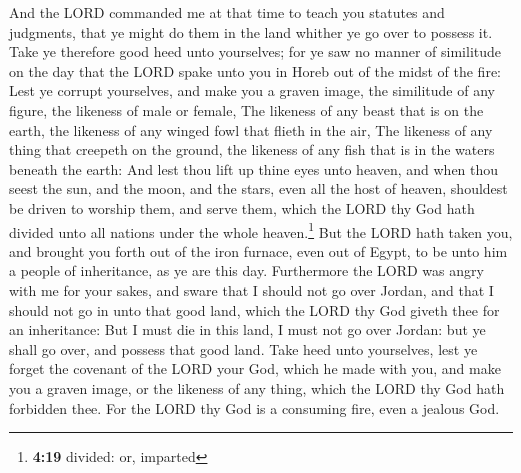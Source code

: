  And the LORD commanded me at that time to teach you
statutes and judgments, that ye might do them in the land whither ye go
over to possess it.  Take ye therefore good heed unto
yourselves; for ye saw no manner of similitude on the day that the LORD
spake unto you in Horeb out of the midst of the fire: 
Lest ye corrupt yourselves, and make you a graven image, the similitude
of any figure, the likeness of male or female,  The
likeness of any beast that is on the earth, the likeness of any winged
fowl that flieth in the air,  The likeness of any thing
that creepeth on the ground, the likeness of any fish that is in the
waters beneath the earth:  And lest thou lift up thine
eyes unto heaven, and when thou seest the sun, and the moon, and the
stars, even all the host of heaven, shouldest be driven to worship them,
and serve them, which the LORD thy God hath divided unto all nations
under the whole heaven.\footnote{\textbf{4:19} divided: or, imparted}
 But the LORD hath taken you, and brought you forth out
of the iron furnace, even out of Egypt, to be unto him a people of
inheritance, as ye are this day.  Furthermore the LORD
was angry with me for your sakes, and sware that I should not go over
Jordan, and that I should not go in unto that good land, which the LORD
thy God giveth thee for an inheritance:  But I must die
in this land, I must not go over Jordan: but ye shall go over, and
possess that good land.  Take heed unto yourselves, lest
ye forget the covenant of the LORD your God, which he made with you, and
make you a graven image, or the likeness of any thing, which the LORD
thy God hath forbidden thee.  For the LORD thy God is a
consuming fire, even a jealous God.

